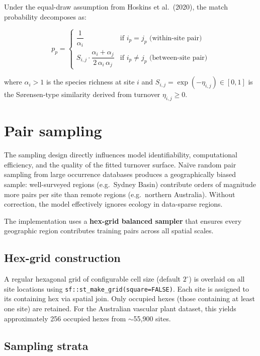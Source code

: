 \documentclass{article}
\begin{document}
Under the equal-draw assumption from Hoskins et al.\ (2020), the match probability decomposes as:

\begin{equation}
    p_p = \begin{cases}
        \dfrac{1}{\alpha_i} & \text{if } i_p = j_p \text{ (within-site pair)} \\[10pt]
        S_{i,j} \cdot \dfrac{\alpha_i + \alpha_j}{2\,\alpha_i\,\alpha_j} & \text{if } i_p \neq j_p \text{ (between-site pair)}
    \end{cases}
\end{equation}

where $\alpha_i > 1$ is the species richness at site $i$ and $S_{i,j} = \exp(-\eta_{i,j}) \in [0,1]$ is the S\o rensen-type similarity derived from turnover $\eta_{i,j} \geq 0$.

\section{Pair sampling}
\label{sec:pair-sampling}

The sampling design directly influences model identifiability, computational efficiency, and the quality of the fitted turnover surface. Na\"ive random pair sampling from large occurrence databases produces a geographically biased sample: well-surveyed regions (e.g.\ Sydney Basin) contribute orders of magnitude more pairs per site than remote regions (e.g.\ northern Australia). Without correction, the model effectively ignores ecology in data-sparse regions.

The implementation uses a \textbf{hex-grid balanced sampler} that ensures every geographic region contributes training pairs across all spatial scales.

\subsection{Hex-grid construction}

A regular hexagonal grid of configurable cell size (default $2^\circ$) is overlaid on all site locations using \texttt{sf::st\_make\_grid(square=FALSE)}. Each site is assigned to its containing hex via spatial join. Only occupied hexes (those containing at least one site) are retained. For the Australian vascular plant dataset, this yields approximately 256 occupied hexes from $\sim$55,900 sites.

\subsection{Sampling strata}
\end{document}
